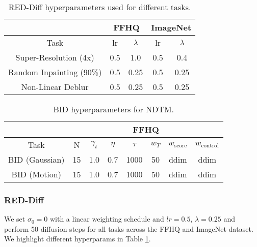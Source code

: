 \begin{table}[t]
\caption{RED-Diff hyperparameters used for different tasks.}
\centering
\begin{tabular}{@{}ccccc@{}}
\toprule
                         & \multicolumn{2}{c}{FFHQ} & \multicolumn{2}{c}{ImageNet} \\ \midrule
Task                     & lr       & $\lambda$     & lr         & $\lambda$       \\ \midrule
Super-Resolution (4x)    & 0.5      & 1.0           & 0.5        &   0.4              \\
Random Inpainting (90\%) & 0.5      & 0.25          & 0.5        & 0.25            \\
Non-Linear Deblur        & 0.5      & 0.25          & 0.5        & 0.25            \\ \bottomrule
\end{tabular}
    \label{table:reddiff_hparams}
\end{table}

\begin{table}[t]
\caption{BID hyperparameters for NDTM.}
\centering
\small
\begin{tabular}{cccccccc}
\toprule
\multicolumn{1}{c|}{}     & \multicolumn{7}{c}{FFHQ}                                                                              \\ \midrule
\multicolumn{1}{c|}{Task} & N  & $\gamma_t$ & $\eta$ & $\tau$ & $w_T$ & $w_\text{score}$ & \multicolumn{1}{c}{$w_\text{control}$} \\ \midrule
BID (Gaussian)            & 15 & 1.0        & 0.7    & 1000   & 50    & ddim             & ddim                                    \\ \midrule
BID (Motion)              & 15 & 1.0        & 0.7    & 1000   & 50    & ddim             & ddim                 \\\bottomrule                  
\end{tabular}
\label{table:bid_hparams}
\end{table}

\subsubsection{RED-Diff \citep{mardani2023variational}}
We set $\sigma_0=0$ with a linear weighting schedule and $lr=0.5$, $\lambda=0.25$ and perform 50 diffusion steps for all tasks across the FFHQ and ImageNet dataset. We highlight different hyperparams in Table \ref{table:reddiff_hparams}.


